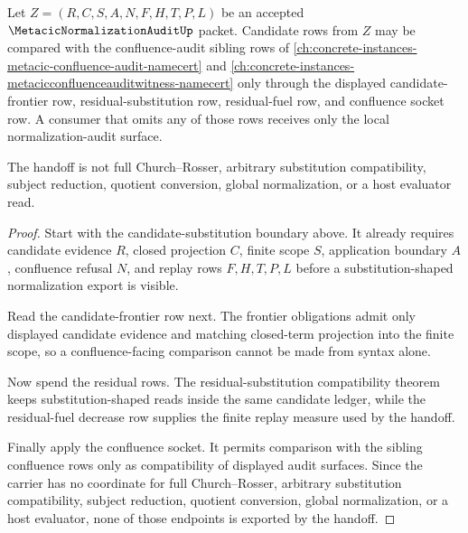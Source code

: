 \begin{theorem}
\label{thm:metacic-normalization-audit-candidate-confluence-handoff}
Let $Z=(R,C,S,A,N,F,H,T,P,L)$ be an accepted
$\MetacicNormalizationAuditUp$ packet. Candidate rows from $Z$ may be compared
with the confluence-audit sibling rows of
\autoref{ch:concrete-instances-metacic-confluence-audit-namecert} and
\autoref{ch:concrete-instances-metacicconfluenceauditwitness-namecert} only
through the displayed candidate-frontier row, residual-substitution row,
residual-fuel row, and confluence socket row. A consumer that omits any of
those rows receives only the local normalization-audit surface.

The handoff is not full Church--Rosser, arbitrary substitution compatibility,
subject reduction, quotient conversion, global normalization, or a host
evaluator read.
\end{theorem}
\begin{proof}
Start with the candidate-substitution boundary above. It already requires
candidate evidence $R$, closed projection $C$, finite scope $S$, application
boundary $A$, confluence refusal $N$, and replay rows $F,H,T,P,L$ before a
substitution-shaped normalization export is visible.

Read the candidate-frontier row next. The frontier obligations admit only
displayed candidate evidence and matching closed-term projection into the
finite scope, so a confluence-facing comparison cannot be made from syntax
alone.

Now spend the residual rows. The residual-substitution compatibility theorem
keeps substitution-shaped reads inside the same candidate ledger, while the
residual-fuel decrease row supplies the finite replay measure used by the
handoff.

Finally apply the confluence socket. It permits comparison with the sibling
confluence rows only as compatibility of displayed audit surfaces. Since the
carrier has no coordinate for full Church--Rosser, arbitrary substitution
compatibility, subject reduction, quotient conversion, global normalization,
or a host evaluator, none of those endpoints is exported by the handoff.
\end{proof}

